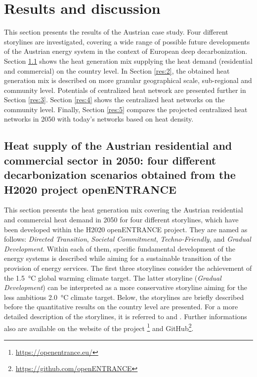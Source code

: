 \section{Results and discussion}\label{results}
This section presents the results of the Austrian case study. Four different storylines are investigated, covering a wide range of possible future developments of the Austrian energy system in the context of European deep decarbonization. Section \ref{res:1} shows the heat generation mix supplying the heat demand (residential and commercial) on the country level. In Section \ref{res:2}, the obtained heat generation mix is described on more granular geographical scale, sub-regional and community level. Potentials of centralized heat network are presented further in Section \ref{res:3}. Section \ref{res:4} shows the centralized heat networks on the community level. Finally, Section \ref{res:5} compares the projected centralized heat networks in 2050 with today's networks based on heat density.

\subsection{Heat supply of the Austrian residential and commercial sector in 2050: four different decarbonization scenarios obtained from the H2020 project openENTRANCE}\label{res:1}
This section presents the heat generation mix covering the Austrian residential and commercial heat demand in 2050 for four different storylines, which have been developed within the H2020 openENTRANCE project. They are named as follows: \textit{Directed Transition}, \textit{Societal Commitment}, \textit{Techno-Friendly}, and \textit{Gradual Development}. Within each of them, specific fundamental development of the energy systems is described while aiming for a sustainable transition of the provision of energy services. The first three storylines consider the achievement of the \SI{1.5}{\degreeCelsius} global warming climate target. The latter storyline (\textit{Gradual Development}) can be interpreted as a more conservative storyline aiming for the less ambitious \SI{2.0}{\degreeCelsius} climate target. Below, the storylines are briefly described before the quantitative results on the country level are presented. For a more detailed description of the storylines, it is referred to \cite{auer2020quantitative} and \cite{auer2020development}. Further informations also are available on the website of the project \footnote{\url{https://openentrance.eu/}} and GitHub\footnote{\url{https://github.com/openENTRANCE}}.\vspace{0.3cm}

